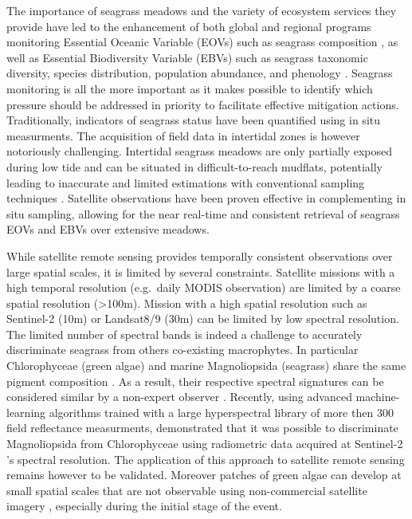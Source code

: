 \documentclass[
  number]{elsarticle}
\begin{document}
The importance of seagrass meadows and the variety of ecosystem services
they provide have led to the enhancement of both global and regional
programs monitoring Essential Oceanic Variable (EOVs) such as seagrass
composition \citep{Miloslavich2018}, as well as Essential Biodiversity
Variable (EBVs) such as seagrass taxonomic diversity, species
distribution, population abundance, and phenology \citep{Pereira2013}.
Seagrass monitoring is all the more important as it makes possible to
identify which pressure should be addressed in priority to facilitate
effective mitigation actions. Traditionally, indicators of seagrass
status have been quantified using in situ measurments. The acquisition
of field data in intertidal zones is however notoriously challenging.
Intertidal seagrass meadows are only partially exposed during low tide
and can be situated in difficult-to-reach mudflats, potentially leading
to inaccurate and limited estimations with conventional sampling
techniques \citep{nijland2019}. Satellite observations have been proven
effective in complementing in situ sampling, allowing for the near
real-time and consistent retrieval of seagrass EOVs and EBVs over
extensive meadows. \citetext{\citealp[ ]{Zoffoli2021}; \citealp[
]{xu2021}; \citealp[ ]{Traganos2018}; \citealp{coffer2023}}

While satellite remote sensing provides temporally consistent
observations over large spatial scales, it is limited by several
constraints. Satellite missions with a high temporal resolution
(e.g.~daily MODIS observation) are limited by a coarse spatial
resolution (\textgreater100m). Mission with a high spatial resolution
such as Sentinel-2 (10m) or Landsat8/9 (30m) can be limited by low
spectral resolution. The limited number of spectral bands is indeed a
challenge to accurately discriminate seagrass from others co-existing
macrophytes. In particular Chlorophyceae (green algae) and marine
Magnoliopsida (seagrass) share the same pigment composition
\citetext{\citealp[ ]{ralph2002}; \citealp{Douay2022}}. As a result,
their respective spectral signatures can be considered similar by a
non-expert observer \citetext{\citealp[
]{Davies2023}; \citealp{bannari2022}}. Recently, using advanced
machine-learning algorithms trained with a large hyperspectral library
of more then 300 field reflectance measurments, \citep{Davies2023}
demonstrated that it was possible to discriminate Magnoliopsida from
Chlorophyceae using radiometric data acquired at Sentinel-2 's spectral
resolution. The application of this approach to satellite remote sensing
remains however to be validated. Moreover patches of green algae can
develop at small spatial scales that are not observable using
non-commercial satellite imagery \citep{tuya2013}, especially during the
initial stage of the event.
\end{document}
